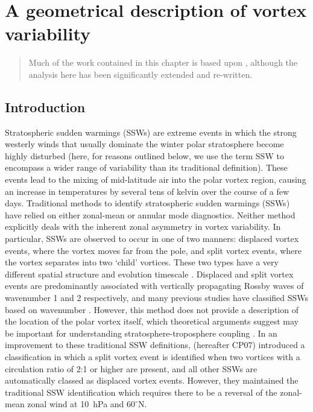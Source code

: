 \chapter{A geometrical description of vortex variability}
\begin{quotation}
Much of the work contained in this chapter is based upon \citet{Seviour2013a},
although the analysis here has been significantly extended and re-written.
\end{quotation}

\label{cha:moments}



\section{Introduction}
Stratospheric sudden warmings (SSWs) are extreme events in which the strong
westerly winds that usually dominate the winter polar stratosphere become highly
disturbed (here, for reasons outlined below, we use the term SSW to encompass a
wider range of variability than its traditional definition). These events lead
to the mixing of mid-latitude air into the polar vortex region, causing an
increase in temperatures by several tens of kelvin over the course of a few
days. Traditional methods to identify stratospheric sudden warmings (SSWs) have
relied on either zonal-mean \citep{Andrews1987} or annular mode
\citep{Baldwin2001a} diagnostics. Neither method explicitly deals with the
inherent zonal asymmetry in vortex variability. In particular, SSWs are observed
to occur in one of two manners: displaced vortex events, where the vortex moves
far from the pole, and split vortex events, where the vortex separates into two
`child' vortices. These two types have a very different spatial structure and
evolution timescale \citep{Matthewman2009}. Displaced and split vortex events
are predominantly associated with vertically propagating Rossby waves of
wavenumber 1 and 2 respectively, and many previous studies have classified SSWs
based on wavenumber \citep[e.g.][]{Nakagawa2006}. However, this method does not
provide a description of the location of the polar vortex itself, which
theoretical arguments suggest may be important for understanding
stratosphere-troposphere coupling \citep{Ambaum2002}. In an improvement to these
traditional SSW definitions, \citet{Charlton2007a} (hereafter CP07) introduced a
classification in which a split vortex event is identified when two vortices
with a circulation ratio of 2:1 or higher are present, and all other SSWs are
automatically classed as displaced vortex events. However, they maintained the
traditional SSW identification which requires there to be a reversal of the
zonal-mean zonal wind at 10~hPa and $60^{\circ}$N.

